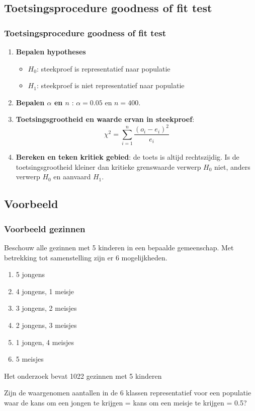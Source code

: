 \documentclass[aspectratio=169]{beamer}
\begin{document}
\subsection{Toetsingsprocedure goodness of fit test}

\begin{frame}
  \frametitle{Toetsingsprocedure goodness of fit test}
  \begin{enumerate}
  \item \textbf{Bepalen hypotheses}
    \begin{itemize}
      \item $H_{0}$: steekproef is representatief naar populatie
      \item $H_{1}$: steekproef is niet representatief naar populatie
    \end{itemize}
  \item \textbf{Bepalen $\alpha$ en $n$} : $\alpha = 0.05$ en $n = 400$.
  \item \textbf{Toetsingsgrootheid en waarde ervan in steekproef}:
  \[ \chi^{2} = \sum_{i=1}^{n} \frac{(o_{i} - e_{i})^{2}}{e_{i}} \]
  \item \textbf{Bereken en teken kritiek gebied}: de toets is altijd rechtszijdig. Is de toetsingsgrootheid kleiner dan kritieke grenswaarde verwerp $H_{0}$ niet, anders verwerp $H_{0}$ en aanvaard $H_{1}$.
\end{enumerate}
\end{frame}

\subsection{Voorbeeld}

\begin{frame}
  \frametitle{Voorbeeld gezinnen}
  Beschouw alle gezinnen met 5 kinderen in een bepaalde gemeenschap.
  \pause
  Met betrekking tot samenstelling zijn er 6 mogelijkheden.
\begin{enumerate}
  \item 5 jongens
  \item 4 jongens, 1 meisje
  \item 3 jongens, 2 meisjes
  \item 2 jongens, 3 meisjes
  \item 1 jongen, 4 meisjes
  \item 5 meisjes
\end{enumerate}
Het onderzoek bevat 1022 gezinnen met 5 kinderen
\begin{center}
Zijn de waargenomen aantallen in de 6 klassen representatief voor een populatie waar de kans om een jongen te krijgen = kans om een meisje te krijgen = 0.5?
\end{center}
\end{frame}
\end{document}
